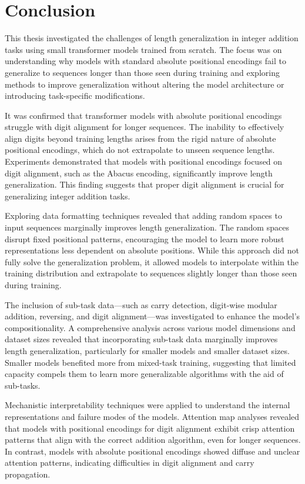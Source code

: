 \chapter{Conclusion}\label{conclusion}

This thesis investigated the challenges of length generalization in integer addition tasks using small transformer models trained from scratch. The focus was on understanding why models with standard absolute positional encodings fail to generalize to sequences longer than those seen during training and exploring methods to improve generalization without altering the model architecture or introducing task-specific modifications.

It was confirmed that transformer models with absolute positional encodings struggle with digit alignment for longer sequences. The inability to effectively align digits beyond training lengths arises from the rigid nature of absolute positional encodings, which do not extrapolate to unseen sequence lengths. Experiments demonstrated that models with positional encodings focused on digit alignment, such as the Abacus encoding, significantly improve length generalization. This finding suggests that proper digit alignment is crucial for generalizing integer addition tasks.

Exploring data formatting techniques revealed that adding random spaces to input sequences marginally improves length generalization. The random spaces disrupt fixed positional patterns, encouraging the model to learn more robust representations less dependent on absolute positions. While this approach did not fully solve the generalization problem, it allowed models to interpolate within the training distribution and extrapolate to sequences slightly longer than those seen during training.

The inclusion of sub-task data—such as carry detection, digit-wise modular addition, reversing, and digit alignment—was investigated to enhance the model's compositionality. A comprehensive analysis across various model dimensions and dataset sizes revealed that incorporating sub-task data marginally improves length generalization, particularly for smaller models and smaller dataset sizes. Smaller models benefited more from mixed-task training, suggesting that limited capacity compels them to learn more generalizable algorithms with the aid of sub-tasks.

Mechanistic interpretability techniques were applied to understand the internal representations and failure modes of the models. Attention map analyses revealed that models with positional encodings for digit alignment exhibit crisp attention patterns that align with the correct addition algorithm, even for longer sequences. In contrast, models with absolute positional encodings showed diffuse and unclear attention patterns, indicating difficulties in digit alignment and carry propagation.

